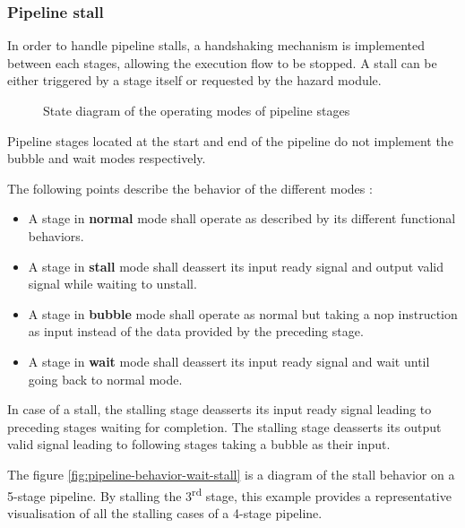 \subsubsection{Pipeline stall}

\label{pipeline-stall}

\begin{content}
    In order to handle pipeline stalls, a handshaking mechanism is implemented between each stages, allowing the execution flow to be stopped. A stall can be either triggered by a stage itself or requested by the hazard module.
\end{content}

\begin{figure}[H]
    \centering
    
    \caption{State diagram of the operating modes of pipeline stages}
    \label{fig:pipeline-stage-state}
\end{figure}

\begin{content}
    Pipeline stages located at the start and end of the pipeline do not implement the bubble and wait modes respectively.
    
    The following points describe the behavior of the different modes :
    \begin{itemize}
        \item A stage in \textbf{normal} mode shall operate as described by its different functional behaviors.
        \item A stage in \textbf{stall} mode shall deassert its input ready signal and output valid signal while waiting to unstall.
        \item A stage in \textbf{bubble} mode shall operate as normal but taking a nop instruction as input instead of the data provided by the preceding stage.
        \item A stage in \textbf{wait} mode shall deassert its input ready signal and wait until going back to normal mode.
    \end{itemize}
    
    In case of a stall, the stalling stage deasserts its input ready signal leading to preceding stages waiting for completion. The stalling stage deasserts its output valid signal leading to following stages taking a bubble as their input.

    The figure \ref{fig:pipeline-behavior-wait-stall} is a diagram of the stall behavior on a 5-stage pipeline. By stalling the 3\textsuperscript{rd} stage, this example provides a representative visualisation of all the stalling cases of a 4-stage pipeline.
\end{content}

